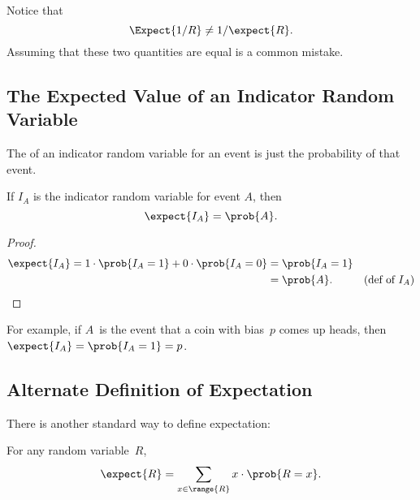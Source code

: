 Notice that
\[
\Expect{1/R} \neq 1/\expect{R}.
\]
Assuming that these two quantities are equal is a common mistake.

\subsection{The Expected Value of an Indicator Random Variable}

The  of an  indicator random
variable for an event is just the probability of that event.

\begin{lemma}\label{expindic}
If $I_A$ is the indicator random variable for event $A$, then
\[
\expect{I_A} = \prob{A}.
\]
\end{lemma}

\begin{proof}
\begin{align*}
\expect{I_A} =  1 \cdot \prob{I_A = 1} + 0 \cdot \prob{I_A = 0}
     & = \prob{I_A = 1} \\
     & =  \prob{A}.\qedhere & \text{(def of $I_A$)}
\end{align*}
\end{proof}
For example, if $A$~is the event that a coin with bias~$p$ comes up
heads, then $\expect{I_A} = \prob{I_A=1} = p$.

\subsection{Alternate Definition of Expectation}
There is another standard way to define expectation:
\begin{theorem}\label{thm:altexpdef}
For any  random variable~$R$,
\begin{equation}\label{eqn:altexpdef}
    \expect{R} = \sum_{x \in \range{R}} x \cdot \prob{R = x}.
\end{equation}
\end{theorem}


